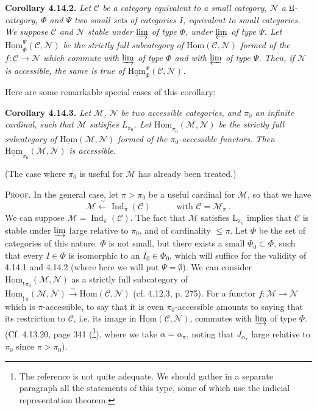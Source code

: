 \documentclass[11pt]{article}
\newcommand{\msp}[1]{\marginpar{\footnotesize [#1]}}
\newcommand{\uHom}{\underline{\mathrm{Hom}}}
\newcommand{\Ind}{\operatorname{Ind}}
\begin{document}
\msp{page 372}

\noindent\textbf{Corollary 4.14.2.} {\itshape Let $\mathcal{C}$ be a category equivalent to a small category, $\mathcal{N}$ a $\mathfrak{U}$-category, $\Phi$ and $\Psi$ two small sets of categories $I$, equivalent to small categories. We suppose $\mathcal{C}$ and $\mathcal{N}$ stable under $\varinjlim$ of type $\Phi$, under $\varprojlim$ of type $\Psi$. Let $\uHom^{\Psi}_{\Phi}(\mathcal{C},\mathcal{N})$ be the strictly full subcategory of $\uHom(\mathcal{C},\mathcal{N})$ formed of the $f:\mathcal{C}\longrightarrow\mathcal{N}$ which commute with $\varinjlim$ of type $\Phi$ and with $\varprojlim$ of type $\Psi$. Then, if $\mathcal{N}$ is accessible, the same is true of $\uHom^{\Psi}_{\Phi}(\mathcal{C},\mathcal{N})$.}

Here are some remarkable special cases of this corollary:

\noindent\textbf{Corollary 4.14.3.} {\itshape Let $\mathcal{M}$, $\mathcal{N}$ be two accessible categories, and $\pi_0$ an infinite cardinal, such that $\mathcal{M}$ satisfies $L_{\pi_0}$. Let $\uHom_{\pi_0}(\mathcal{M},\mathcal{N})$ be the strictly full subcategory of $\uHom(\mathcal{M},\mathcal{N})$ formed of the $\pi_0$-accessible functors. Then $\uHom_{\pi_0}(\mathcal{M},\mathcal{N})$ is accessible.}

\msp{page 373}

(The case where $\pi_0$ is useful for $\mathcal{M}$ has already been treated.)

\noindent\textsc{Proof}. In the general case, let $\pi>\pi_0$ be a useful cardinal for $\mathcal{M}$, so that we have
\[
\mathcal{M} \xleftarrow{\ \sim\ } \Ind_\pi(\mathcal{C}) \qquad\quad \text{with } \mathcal{C}=\mathcal{M}_\pi\ .
\]
We can suppose $\mathcal{M}=\Ind_\pi(\mathcal{C})$. The fact that $\mathcal{M}$ satisfies $\mathrm{L}_{\pi_0}$ implies that $\mathcal{C}$ is stable under $\varinjlim$ large relative to $\pi_0$, and of cardinality $\leqslant\pi$. Let $\Phi$ be the set of categories of this nature. $\Phi$ is not small, but there exists a small $\Phi_0\subset\Phi$, such that every $I\in\Phi$ is isomorphic to an $I_0\in\Phi_0$, which will suffice for the validity of 4.14.1 and 4.14.2 (where here we will put $\Psi=\emptyset$). We can consider $\uHom_{!\,\pi_0}(\mathcal{M},\mathcal{N})$ as a strictly full subcategory of $\uHom_{!\,\pi}(\mathcal{M},\mathcal{N})\xrightarrow{\ \sim\ }\uHom(\mathcal{C},\mathcal{N})$ (cf. 4.12.3, p. 275). For a functor $f:\mathcal{M}\longrightarrow\mathcal{N}$ which is $\pi$-accessible, to say that it is even $\pi_0$-accessible amounts to saying that its restriction to $\mathcal{C}$, i.e. its image in $\uHom(\mathcal{C},\mathcal{N})$, commutes with $\varinjlim$ of type $\Phi$. (Cf. 4.13.20, page 341 (\footnote[164]{The reference is not quite adequate. We should gather in a separate paragraph all the statements of this type, some of which use the indicial representation theorem.}), where we take $\alpha=\alpha_\pi$, noting that $J_{\alpha_\pi}$ large relative to $\pi_0$ since $\pi>\pi_0$).
\end{document}
